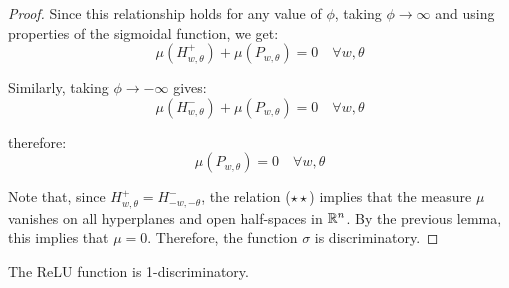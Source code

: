 \begin{proof}
    Since this relationship holds for any value of $\phi$, taking $\phi \to \infty$ and using properties of
    the sigmoidal function, we get:
    $$\mu(H_{w, \theta}^+) + \mu(P_{w, \theta}) = 0 \quad \forall w, \theta$$

    Similarly, taking $\phi \to -\infty$ gives:
    \begin{equation}
        \mu(H_{w, \theta}^-) + \mu(P_{w, \theta}) = 0 \quad \forall w, \theta
        \tag{$\star\star$}
    \end{equation}

    therefore:
    $$\mu(P_{w, \theta}) = 0 \quad \forall w, \theta$$

    Note that, since $H_{w, \theta}^+ = H_{-w, -\theta}^-$, the relation ($\star\star$) implies that
    the measure $\mu$ vanishes on all hyperplanes and open half-spaces in $\mathbb{R}^n$. By the previous lemma,
    this implies that $\mu = 0$. Therefore, the function $\sigma$ is discriminatory.

\end{proof}

\begin{proposition}
    The ReLU function is 1-discriminatory.
\end{proposition}

